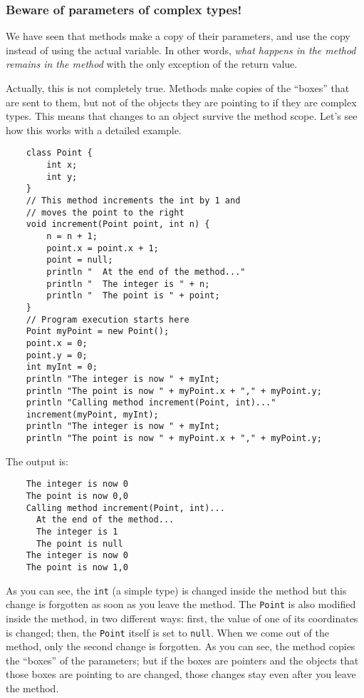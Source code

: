 \subsubsection{Beware of parameters of complex types!}
\label{beware}

We have seen that methods make a copy of their
parameters, and use the copy instead of using the actual variable. In
other words, \emph{what happens in the method remains in the method}
with the only exception of the return value. 

Actually, this is not completely true. Methods make copies of the
``boxes'' that are sent to them, but not of the objects they are
pointing to if they are complex types. This means that changes to an
object survive the method scope. Let's see how this works with a
detailed example. 

\begin{verbatim}
    class Point {
        int x;
        int y;
    }
    // This method increments the int by 1 and 
    // moves the point to the right
    void increment(Point point, int n) {
        n = n + 1;
        point.x = point.x + 1;
        point = null;
        println "  At the end of the method..."
        println "  The integer is " + n;
        println "  The point is " + point;
    }
    // Program execution starts here
    Point myPoint = new Point();
    point.x = 0;
    point.y = 0;
    int myInt = 0;
    println "The integer is now " + myInt;
    println "The point is now " + myPoint.x + "," + myPoint.y;
    println "Calling method increment(Point, int)..."
    increment(myPoint, myInt);
    println "The integer is now " + myInt;
    println "The point is now " + myPoint.x + "," + myPoint.y;
\end{verbatim}

The output is: 

\begin{verbatim}
    The integer is now 0
    The point is now 0,0
    Calling method increment(Point, int)...
      At the end of the method...
      The integer is 1
      The point is null
    The integer is now 0
    The point is now 1,0
\end{verbatim}

As you can see, the \verb+int+ (a simple type) is changed inside the
method but this change is forgotten as soon as you leave the
method. The \verb+Point+ is also modified inside the method, 
in two different
ways: first, the value of one of its coordinates is changed; then, the
\verb+Point+ itself is set to \verb+null+. When we come out of the method,
only the second change is forgotten. As you can see, the method copies
the ``boxes'' of the parameters; but if the boxes are pointers and the
objects that those boxes are pointing to are changed, those changes stay
even after you leave the method. 

